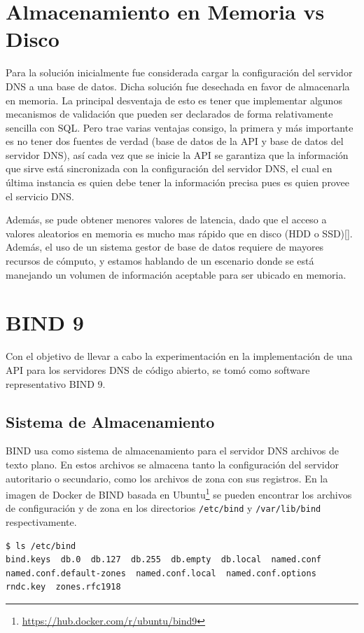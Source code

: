 \section{Almacenamiento en Memoria vs Disco}

Para la solución inicialmente fue considerada cargar la configuración del servidor DNS a una base de datos. Dicha solución fue desechada en favor de almacenarla en memoria. La principal desventaja de esto es tener que implementar algunos mecanismos de validación que pueden ser declarados de forma relativamente sencilla con SQL. Pero trae varias ventajas consigo, la primera y más importante es no tener dos fuentes de verdad (base de datos de la API y base de datos del servidor DNS), así cada vez que se inicie la API se garantiza que la información que sirve está sincronizada con la configuración del servidor DNS, el cual en última instancia es quien debe tener la información precisa pues es quien provee el servicio DNS.

Además, se pude obtener menores valores de latencia, dado que el acceso a valores aleatorios en memoria es mucho mas rápido que en disco (HDD o SSD)[\cite{jacobs2009pathologies}]. Además, el uso de un sistema gestor de base de datos requiere de mayores recursos de cómputo, y estamos hablando de un escenario donde se está manejando un volumen de información aceptable para ser ubicado en memoria.

\section{BIND 9}

Con el objetivo de llevar a cabo la experimentación en la implementación de una API para los servidores DNS de código abierto, se tomó como software representativo BIND 9.

\subsection{Sistema de Almacenamiento}
BIND usa como sistema de almacenamiento para el servidor DNS archivos de texto plano. En estos archivos se almacena tanto la configuración del servidor autoritario o secundario, como los archivos de zona con sus registros. En la imagen de Docker de BIND basada en Ubuntu\footnote{\url{https://hub.docker.com/r/ubuntu/bind9}} se pueden encontrar los archivos de configuración y de zona en los directorios \verb+/etc/bind+ y \verb+/var/lib/bind+ respectivamente.

\begin{lstlisting}[frame=single, numbers=none, caption=Contenido del directorio \textbf{/etc/bind}.]
$ ls /etc/bind
bind.keys  db.0  db.127  db.255  db.empty  db.local  named.conf
named.conf.default-zones  named.conf.local  named.conf.options
rndc.key  zones.rfc1918
\end{lstlisting}

